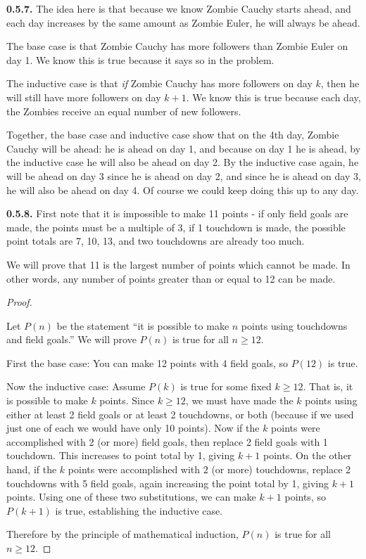 \documentclass[12pt,]{book}
\theoremstyle{plain}
\theoremstyle{definition}
\theoremstyle{definition}
\theoremstyle{definition}
\numberwithin{equation}{chapter}
\begin{document}
\par\smallskip
\noindent\textbf{0.5.7.} \hypertarget{p-452}{}%
The idea here is that because we know Zombie Cauchy starts ahead, and each day increases by the same amount as Zombie Euler, he will always be ahead.%
\par
\hypertarget{p-453}{}%
The base case is that Zombie Cauchy has more followers than Zombie Euler on day 1. We know this is true because it says so in the problem.%
\par
\hypertarget{p-454}{}%
The inductive case is that \emph{if} Zombie Cauchy has more followers on day \(k\), then he will still have more followers on day \(k+1\). We know this is true because each day, the Zombies receive an equal number of new followers.%
\par
\hypertarget{p-455}{}%
Together, the base case and inductive case show that on the 4th day, Zombie Cauchy will be ahead: he is ahead on day 1, and because on day 1 he is ahead, by the inductive case he will also be ahead on day 2. By the inductive case again, he will be ahead on day 3 since he is ahead on day 2, and since he is ahead on day 3, he will also be ahead on day 4. Of course we could keep doing this up to any day.%
\par\smallskip
\noindent\textbf{0.5.8.} \hypertarget{p-457}{}%
First note that it is impossible to make 11 points - if only field goals are made, the points must be a multiple of 3, if 1 touchdown is made, the possible point totals are 7, 10, 13, \textellipsis{} and two touchdowns are already too much.%
\par
\hypertarget{p-458}{}%
We will prove that 11 is the largest number of points which cannot be made. In other words, any number of points greater than or equal to 12 can be made.%
\begin{proof}\hypertarget{proof-11}{}
\hypertarget{p-459}{}%
Let \(P(n)\) be the statement ``it is possible to make \(n\) points using touchdowns and field goals.'' We will prove \(P(n)\) is true for all \(n \ge 12\).%
\par
\hypertarget{p-460}{}%
First the base case: You can make 12 points with 4 field goals, so \(P(12)\) is true.%
\par
\hypertarget{p-461}{}%
Now the inductive case: Assume \(P(k)\) is true for some fixed \(k \ge 12\). That is, it is possible to make \(k\) points. Since \(k \ge 12\), we must have made the \(k\) points using either at least 2 field goals or at least 2 touchdowns, or both (because if we used just one of each we would have only 10 points). Now if the \(k\) points were accomplished with 2 (or more) field goals, then replace 2 field goals with 1 touchdown. This increases to point total by 1, giving \(k + 1\) points. On the other hand, if the \(k\) points were accomplished with \(2\) (or more) touchdowns, replace 2 touchdowns with 5 field goals, again increasing the point total by 1, giving \(k+1\) points. Using one of these two substitutions, we can make \(k+1\) points, so \(P(k+1)\) is true, establishing the inductive case.%
\par
\hypertarget{p-462}{}%
Therefore by the principle of mathematical induction, \(P(n)\) is true for all \(n \ge 12\).%
\end{proof}
\end{document}
